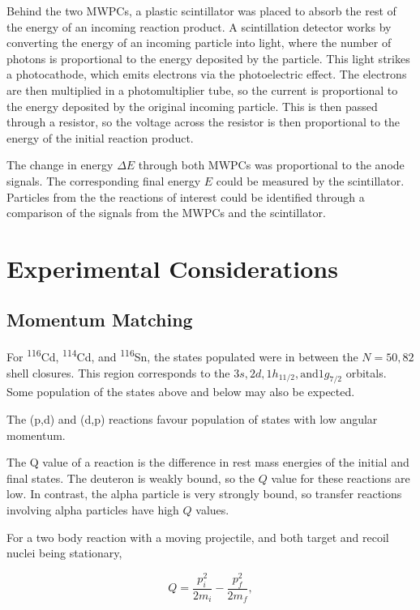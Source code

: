 Behind the two MWPCs, a plastic scintillator was placed to absorb the rest of the energy of an incoming reaction product. A scintillation detector works by converting the energy of an incoming particle into light, where the number of photons is proportional to the energy deposited by the particle. This light strikes a photocathode, which emits electrons via the photoelectric effect. The electrons are then multiplied in a photomultiplier tube, so the current is proportional to the energy deposited by the original incoming particle. This is then passed through a resistor, so the voltage across the resistor is then proportional to the energy of the initial reaction product.

The change in energy $\Delta E$ through both MWPCs was proportional to the anode signals. The corresponding final energy $E$ could be measured by the scintillator. Particles from the the reactions of interest could be identified through a comparison of the signals from the MWPCs and the scintillator.


\section{Experimental Considerations}

\subsection{Momentum Matching}

For \textsuperscript{116}Cd, \textsuperscript{114}Cd, and \textsuperscript{116}Sn, the states populated were in between the $N = 50, 82$ shell closures. This region corresponds to the $3s, 2d, 1h_{11/2}, \mathrm{and }1g_{7/2}$ orbitals. Some population of the states above and below may also be expected.

The (p,d) and (d,p) reactions favour population of states with low angular momentum.

The Q value of a reaction is the difference in rest mass energies of the initial and final states\cite{krane}. The deuteron is weakly bound, so the $Q$ value for these reactions are low. In contrast, the alpha particle is very strongly bound\cite{krane}, so transfer reactions involving alpha particles have high $Q$ values.

For a two body reaction with a moving projectile, and both target and recoil nuclei being stationary,

\begin{equation}
Q =\frac{p_i^2}{2m_i} - \frac{p_f^2}{2m_f}\mathrm{,}
\end{equation}

